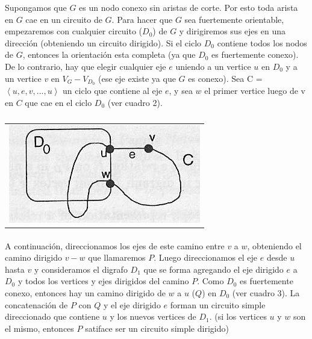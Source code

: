Supongamos que $G$ es un nodo conexo sin aristas de corte. Por esto toda arista en $G$ cae en un circuito de $G$.
Para hacer que $G$ sea fuertemente orientable, empezaremos con cualquier circuito ($D_0$) de $G$ y dirigiremos sus ejes en una dirección (obteniendo un circuito dirigido). Si el ciclo $D_0$ contiene todos los nodos de $G$, entonces la orientación esta completa (ya que $D_0$ es fuertemente conexo). De lo contrario, hay que elegir cualquier eje $e$ uniendo a un vertice $u$ en $D_0$ y a un vertice $v$ en $V_G - V_{D_0}$ (ese eje existe ya que $G$ es conexo). Sea C = $\left\langle u,e,v,...,u  \right\rangle$ un ciclo que contiene al eje $e$, y sea $w$ el primer vertice luego de v en $C$ que cae en el ciclo $D_0$ (ver cuadro 2).

	\begin{table}[h!] %
		\centering %
			\begin{tabular}{c}
				\includegraphics[scale=0.7]{./otros/figura2.jpg} 

				\end{tabular}
				\caption{} %
				\label{} %
	\end{table}

\paragraph{}
A continuación, direccionamos los ejes de este camino entre $v$ a $w$, obteniendo el camino dirigido $v-w$ que llamaremos $P$. Luego direccionamos el eje $e$ desde $u$ hasta $v$ y consideramos el digrafo $D_1$ que se forma agregando el eje dirigido $e$ a $D_0$ y todos los vertices y ejes dirigidos del camino $P$. Como $D_0$ es fuertemente conexo, entonces hay un camino dirigido de $w$ a $u$ ($Q$) en $D_0$ (ver cuadro 3). La concatenación de $P$ con $Q$ y el eje dirigido $e$ forman un circuito simple direccionado que contiene $u$ y los nuevos vertices de $D_1$. (si los vertices $u$ y $w$ son el mismo, entonces $P$ satiface ser un circuito simple dirigido)



